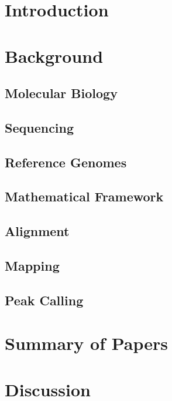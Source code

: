\chapter{Introduction}

\clearpage
\chapter{Background}
\label{sec:background}
\section{Molecular Biology}
\label{sec:biology}

\clearpage
\section{Sequencing}
\label{sec:sequencing}

\clearpage
\section{Reference Genomes}
\label{sec:refgenomes}

\clearpage
\section{Mathematical Framework}
\label{sec:notation}

\clearpage
\section{Alignment}
\label{sec:alignment}

\clearpage
\section{Mapping}
\label{sec:mapping}

\clearpage
\section{Peak Calling}
\label{sec:peakcalling}

\clearpage
\chapter{Summary of Papers}
\label{sec:summary}

\chapter{Discussion}
\label{sec:discussion}

% 
% 
% 
% 
% 
% 
% 

